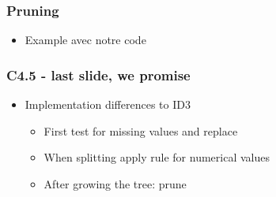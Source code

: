 \begin{frame}
\frametitle{Pruning}
\begin{itemize}
\item Example avec notre code
\end{itemize}
\end{frame}

\begin{frame}
\frametitle{C4.5 - last slide, we promise}
\begin{itemize}
\item Implementation differences to ID3
\begin{itemize}
\vfill
\item First test for missing values and replace
\vfill
\item When splitting apply rule for numerical values
\vfill
\item After growing the tree: prune
\vfill
\end{itemize}
\end{itemize}
\end{frame}